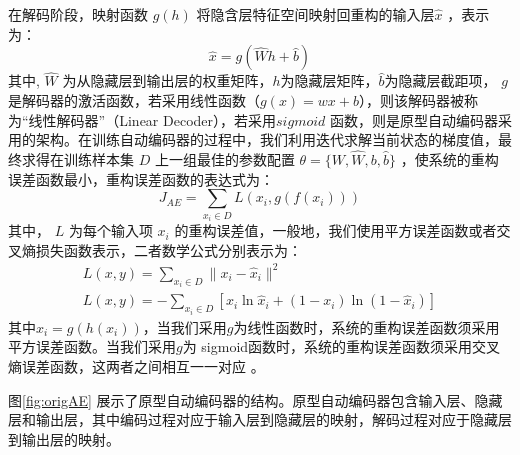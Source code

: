\documentclass[oneside]{ZJUthesis}
\begin{document}
在解码阶段，映射函数 $g(h)$ 将隐含层特征空间映射回重构的输入层$\hat x$ ，表示为：
\begin{equation}
	\hat x=g(\hat{W}h+\hat b)
\end{equation}	
其中, $\hat{W}$ 为从隐藏层到输出层的权重矩阵，$h$为隐藏层矩阵，$\hat b$为隐藏层截距项， $g$ 是解码器的激活函数，若采用线性函数（$g(x)=wx+b$），则该解码器被称为``线性解码器''（Linear Decoder），若采用$sigmoid$ 函数，则是原型自动编码器采用的架构。在训练自动编码器的过程中，我们利用迭代求解当前状态的梯度值，最终求得在训练样本集 $D$ 上一组最佳的参数配置 $\theta=\{W,\hat W,b,\hat b\}$ ，使系统的重构误差函数最小，重构误差函数的表达式为：
\begin{equation}
	J_{AE}=\sum\limits_{x_i \in D}L(x_i,g(f(x_i)))
\end{equation}
其中， $L$ 为每个输入项 $x_i$ 的重构误差值，一般地，我们使用平方误差函数或者交叉熵损失函数表示，二者数学公式分别表示为：
\begin{equation}\begin{array}{l}
	L(x,y)=\sum\limits_{x_i \in D}\|x_i-\hat x_i\|^2  \\
    L(x,y)=-\sum\limits_{x_i \in D}[x_i \ln \hat x_i+(1-x_i)\ln(1-\hat x_i)]
\end{array}\end{equation}
其中$\hat x_i=g(h(x_i))$，当我们采用$g$为线性函数时，系统的重构误差函数须采用平方误差函数。当我们采用$g$为 sigmoid函数时，系统的重构误差函数须采用交叉熵误差函数，这两者之间相互一一对应 \cite{17}。



图\ref{fig:origAE} 展示了原型自动编码器的结构。原型自动编码器包含输入层、隐藏层和输出层，其中编码过程对应于输入层到隐藏层的映射，解码过程对应于隐藏层到输出层的映射。
\end{document}
